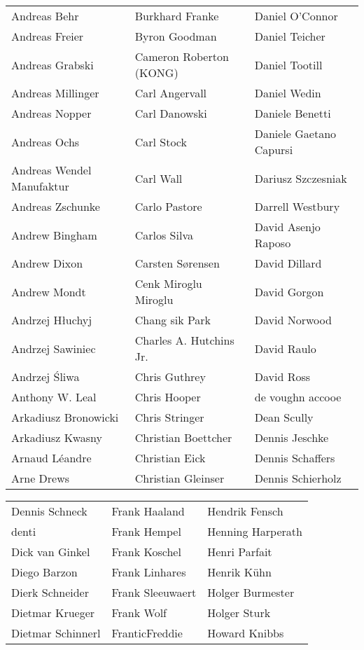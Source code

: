 \begin{small}
\begin{tabular}{p{4cm}p{4cm}p{4cm}}
Andreas Behr & Burkhard Franke & Daniel O'Connor \\
Andreas Freier & Byron Goodman & Daniel Teicher \\
Andreas Grabski & Cameron Roberton (KONG) & Daniel Tootill \\
Andreas Millinger & Carl Angervall & Daniel Wedin \\
Andreas Nopper & Carl Danowski & Daniele Benetti \\
Andreas Ochs & Carl Stock & Daniele Gaetano Capursi \\
Andreas Wendel Manufaktur & Carl Wall & Dariusz Szczesniak \\
Andreas Zschunke & Carlo Pastore & Darrell Westbury \\
Andrew Bingham & Carlos Silva & David Asenjo Raposo \\
Andrew Dixon & Carsten Sørensen & David Dillard \\
Andrew Mondt & Cenk Miroglu Miroglu & David Gorgon \\
Andrzej Hłuchyj & Chang sik Park & David Norwood \\
Andrzej Sawiniec & Charles A. Hutchins Jr. & David Raulo \\
Andrzej Śliwa & Chris Guthrey & David Ross \\
Anthony W. Leal & Chris Hooper & de voughn accooe \\
Arkadiusz Bronowicki & Chris Stringer & Dean Scully \\
Arkadiusz Kwasny & Christian Boettcher & Dennis Jeschke \\
Arnaud Léandre & Christian Eick & Dennis Schaffers \\
Arne Drews & Christian Gleinser & Dennis Schierholz \\
\end{tabular}
\newpage
\setlength{\tabcolsep}{1mm}
\begin{tabular}{p{4cm}p{4cm}p{4cm}}
Dennis Schneck & Frank Haaland & Hendrik Fensch \\
denti & Frank Hempel & Henning Harperath \\
Dick van Ginkel & Frank Koschel & Henri Parfait \\
Diego Barzon & Frank Linhares & Henrik Kühn \\
Dierk Schneider & Frank Sleeuwaert & Holger Burmester \\
Dietmar Krueger & Frank Wolf & Holger Sturk \\
Dietmar Schinnerl & FranticFreddie & Howard Knibbs \\

\end{tabular}
\end{small}
